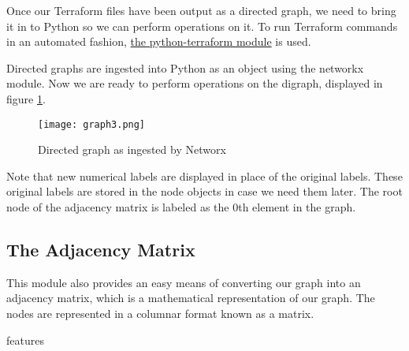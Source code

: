 \justifying
Once our Terraform files have been output as a directed graph, we need to bring it in to Python so we can
perform operations on it. To run Terraform commands in an automated fashion, \href{https://pypi.org/project/python-terraform/}{the python-terraform module}
is used.

\justifying
Directed graphs are ingested into Python as an object using the networkx module. Now we are ready to
perform operations on the digraph, displayed in figure \ref{digraph}.

\justifying
\begin{figure}[H]
    \texttt{[image: graph3.png]}
    \caption{Directed graph as ingested by Networx}
    \label{digraph}
\end{figure}

Note that new numerical labels are displayed in place of the original labels. These original labels are
stored in the node objects in case we need them later. The root node of the adjacency matrix
is labeled as the 0th element in the graph.

\subsection{\label{sec:adjacency}The Adjacency Matrix}

This module also provides
an easy means of converting our graph into an adjacency matrix, which is a mathematical representation of
our graph. The nodes are represented in a columnar format known as a matrix.


features


\clearpage
\begin{versionhistory}
\end{versionhistory}
\nocite{*}




